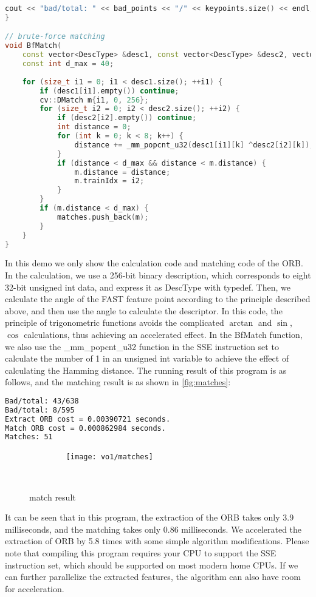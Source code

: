 \begin{lstlisting}[language=c++,caption=slambook2/ch7/orb_self.cpp（片段）]
    cout << "bad/total: " << bad_points << "/" << keypoints.size() << endl;
}

// brute-force matching
void BfMatch(
    const vector<DescType> &desc1, const vector<DescType> &desc2, vector<cv::DMatch> &matches) {
    const int d_max = 40;
    
    for (size_t i1 = 0; i1 < desc1.size(); ++i1) {
        if (desc1[i1].empty()) continue;
        cv::DMatch m{i1, 0, 256};
        for (size_t i2 = 0; i2 < desc2.size(); ++i2) {
            if (desc2[i2].empty()) continue;
            int distance = 0;
            for (int k = 0; k < 8; k++) {
                distance += _mm_popcnt_u32(desc1[i1][k] ^desc2[i2][k]);
            }
            if (distance < d_max && distance < m.distance) {
                m.distance = distance;
                m.trainIdx = i2;
            }
        }
        if (m.distance < d_max) {
            matches.push_back(m);
        }
    }
}
\end{lstlisting}
In this demo we only show the calculation code and matching code of the ORB. In the calculation, we use a 256-bit binary description, which corresponds to eight 32-bit unsigned int data, and express it as DescType with typedef. Then, we calculate the angle of the FAST feature point according to the principle described above, and then use the angle to calculate the descriptor. In this code, the principle of trigonometric functions avoids the complicated $\arctan$ and $\sin$, $\cos$ calculations, thus achieving an accelerated effect. In the BfMatch function, we also use the \_mm\_popcnt\_u32 function in the SSE instruction set to calculate the number of 1 in an unsigned int variable to achieve the effect of calculating the Hamming distance. The running result of this program is as follows, and the matching result is as shown in \autoref{fig:matches}:

\begin{lstlisting}[language=sh,caption=Terminal output:]
Bad/total: 43/638
Bad/total: 8/595
Extract ORB cost = 0.00390721 seconds.
Match ORB cost = 0.000862984 seconds.
Matches: 51
\end{lstlisting}

\begin{figure}[!htp]
    \centering
    \texttt{[image: vo1/matches]}
    \caption{match result}
    \label{fig:matches}
\end{figure}

It can be seen that in this program, the extraction of the ORB takes only 3.9 milliseconds, and the matching takes only 0.86 milliseconds. We accelerated the extraction of ORB by 5.8 times with some simple algorithm modifications. Please note that compiling this program requires your CPU to support the SSE instruction set, which should be supported on most modern home CPUs. If we can further parallelize the extracted features, the algorithm can also have room for acceleration.

